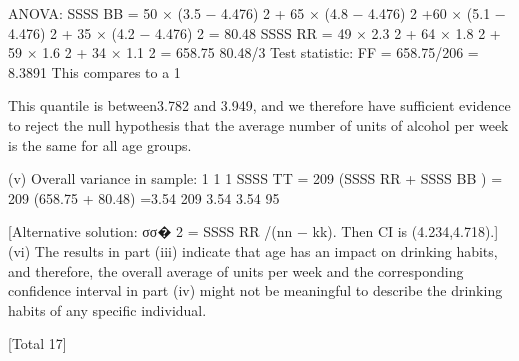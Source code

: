 \documentclass[a4paper,12pt]{article}
\begin{document}
ANOVA:
SSSS BB = 50 × (3.5 − 4.476) 2 + 65 × (4.8 − 4.476) 2
+60 × (5.1 − 4.476) 2 + 35 × (4.2 − 4.476) 2
= 80.48
SSSS RR = 49 × 2.3 2 + 64 × 1.8 2 + 59 × 1.6 2 + 34 × 1.1 2 = 658.75
80.48/3
Test statistic: FF = 658.75/206 = 8.3891
This compares to a 1%






This quantile is between3.782 and 3.949, and we therefore have sufficient evidence to reject the null hypothesis that the average number of units of alcohol per week is the same for all age groups.

(v)
Overall variance in sample:
1
1
1
SSSS TT = 209 (SSSS RR + SSSS BB ) = 209 (658.75 + 80.48) =3.54
209
3.54
3.54
95%


[Alternative solution: σσ� 2 = SSSS RR /(nn − kk). Then CI is (4.234,4.718).]
(vi)
The results in part (iii) indicate that age has an impact on drinking habits,
and therefore, the overall average of units per week and the corresponding
confidence interval in part (iv) might not be meaningful to describe the drinking
habits of any specific individual.

[Total 17]

\end{document}
